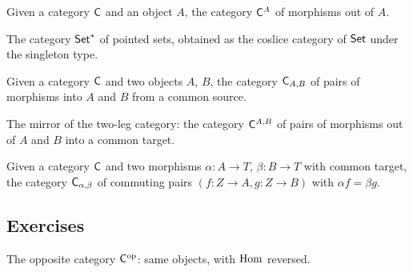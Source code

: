 \begin{definition}
  \label{def:prelims:coslice-category}
  \leanok
  Given a category $\mathsf{C}$ and an object $A$, the category
  $\mathsf{C}^A$ of morphisms out of $A$.
\end{definition}

\begin{definition}
  \label{def:prelims:pointed-set-category}
  \leanok
  The category $\mathsf{Set}^*$ of pointed sets, obtained as the
  coslice category of $\mathsf{Set}$ under the singleton type.
\end{definition}

\begin{definition}
  \label{def:prelims:two-leg-category}
  \leanok
  Given a category $\mathsf{C}$ and two objects $A$, $B$, the category
  $\mathsf{C}_{A,B}$ of pairs of morphisms into $A$ and $B$ from a
  common source.
\end{definition}

\begin{definition}
  \label{def:prelims:two-leg-co-category}
  \leanok
  The mirror of the two-leg category: the category
  $\mathsf{C}^{A,B}$ of pairs of morphisms out of $A$ and $B$ into a
  common target.
\end{definition}

\begin{definition}
  \label{def:prelims:fibered-category}
  \leanok
  Given a category $\mathsf{C}$ and two morphisms $\alpha : A \to T$,
  $\beta : B \to T$ with common target, the category
  $\mathsf{C}_{\alpha,\beta}$ of commuting pairs $(f : Z \to A, g : Z
  \to B)$ with $\alpha f = \beta g$.
\end{definition}

\subsection*{Exercises}

\begin{definition}
  \label{def:prelims:op-category}
  \leanok
  The opposite category $\mathsf{C}^{\mathrm{op}}$: same objects, with
  $\operatorname{Hom}$ reversed.
\end{definition}

